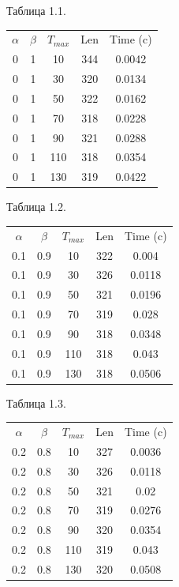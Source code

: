 \documentclass[12pt]{report}
\begin{document}
	\begin{minipage}{0.5\textwidth}
			\begin{center}
				Таблица 1.1.
				
				\begin{tabular}{|c c c c c|}
					\hline
					$\alpha$ & $\beta$ & $T_{max}$ & Len & Time (c) \\ [0.5ex]
					0 & 1 & 10 & 344 & 0.0042 \\ 
					\hline 
					0 & 1 & 30 & 320 & 0.0134 \\ 
					\hline 
					0 & 1 & 50 & 322 & 0.0162 \\ 
					\hline 
					0 & 1 & 70 & 318 & 0.0228 \\ 
					\hline 
					0 & 1 & 90 & 321 & 0.0288 \\ 
					\hline 
					0 & 1 & 110 & 318 & 0.0354 \\ 
					\hline 
					0 & 1 & 130 & 319 & 0.0422 \\ 
					\hline 
				\end{tabular}
			
				Таблица 1.2.
				
				\begin{tabular}{|c c c c c|}
					\hline
					$\alpha$ & $\beta$ & $T_{max}$ & Len & Time (c) \\ [0.5ex]
					0.1 & 0.9 & 10 & 322 & 0.004 \\ 
					\hline 
					0.1 & 0.9 & 30 & 326 & 0.0118 \\ 
					\hline 
					0.1 & 0.9 & 50 & 321 & 0.0196 \\ 
					\hline 
					0.1 & 0.9 & 70 & 319 & 0.028 \\ 
					\hline 
					0.1 & 0.9 & 90 & 318 & 0.0348 \\ 
					\hline 
					0.1 & 0.9 & 110 & 318 & 0.043 \\ 
					\hline 
					0.1 & 0.9 & 130 & 318 & 0.0506 \\ 
					\hline 
				\end{tabular}
			
				Таблица 1.3.
				
				\begin{tabular}{|c c c c c|}
					\hline
					$\alpha$ & $\beta$ & $T_{max}$ & Len & Time (c) \\ [0.5ex]
					0.2 & 0.8 & 10 & 327 & 0.0036 \\ 
					\hline 
					0.2 & 0.8 & 30 & 326 & 0.0118 \\ 
					\hline 
					0.2 & 0.8 & 50 & 321 & 0.02 \\ 
					\hline 
					0.2 & 0.8 & 70 & 319 & 0.0276 \\ 
					\hline 
					0.2 & 0.8 & 90 & 320 & 0.0354 \\ 
					\hline 
					0.2 & 0.8 & 110 & 319 & 0.043 \\ 
					\hline 
					0.2 & 0.8 & 130 & 320 & 0.0508 \\ 
					\hline 
				\end{tabular}
			

\end{center}
\end{minipage}
\end{document}
